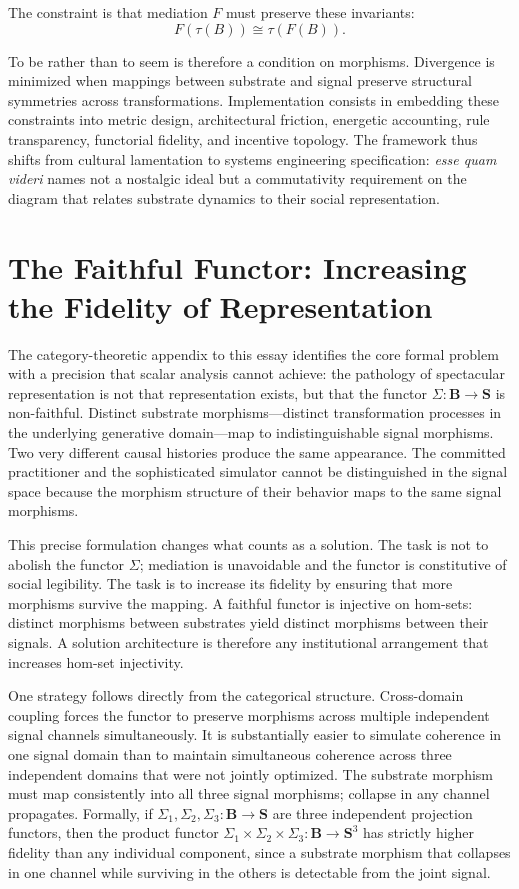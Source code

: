 \documentclass[11pt]{article}
\begin{document}
The constraint is that mediation $F$ must preserve these invariants:
\[
F(\tau(B)) \cong \tau(F(B)).
\]

To be rather than to seem is therefore a condition on morphisms. Divergence is minimized when mappings between substrate and signal preserve structural symmetries across transformations. Implementation consists in embedding these constraints into metric design, architectural friction, energetic accounting, rule transparency, functorial fidelity, and incentive topology. The framework thus shifts from cultural lamentation to systems engineering specification: \textit{esse quam videri} names not a nostalgic ideal but a commutativity requirement on the diagram that relates substrate dynamics to their social representation.

\section{The Faithful Functor: Increasing the Fidelity of Representation}

The category-theoretic appendix to this essay identifies the core formal problem with a precision that scalar analysis cannot achieve: the pathology of spectacular representation is not that representation exists, but that the functor $\Sigma : \mathbf{B} \to \mathbf{S}$ is non-faithful. Distinct substrate morphisms---distinct transformation processes in the underlying generative domain---map to indistinguishable signal morphisms. Two very different causal histories produce the same appearance. The committed practitioner and the sophisticated simulator cannot be distinguished in the signal space because the morphism structure of their behavior maps to the same signal morphisms.

This precise formulation changes what counts as a solution. The task is not to abolish the functor $\Sigma$; mediation is unavoidable and the functor is constitutive of social legibility. The task is to increase its fidelity by ensuring that more morphisms survive the mapping. A faithful functor is injective on hom-sets: distinct morphisms between substrates yield distinct morphisms between their signals. A solution architecture is therefore any institutional arrangement that increases hom-set injectivity.

One strategy follows directly from the categorical structure. Cross-domain coupling forces the functor to preserve morphisms across multiple independent signal channels simultaneously. It is substantially easier to simulate coherence in one signal domain than to maintain simultaneous coherence across three independent domains that were not jointly optimized. The substrate morphism must map consistently into all three signal morphisms; collapse in any channel propagates. Formally, if $\Sigma_1, \Sigma_2, \Sigma_3 : \mathbf{B} \to \mathbf{S}$ are three independent projection functors, then the product functor $\Sigma_1 \times \Sigma_2 \times \Sigma_3 : \mathbf{B} \to \mathbf{S}^3$ has strictly higher fidelity than any individual component, since a substrate morphism that collapses in one channel while surviving in the others is detectable from the joint signal.
\end{document}
